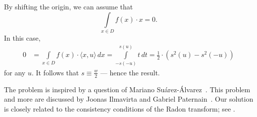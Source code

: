 By shifting the origin, we can assume that
\[\int\limits_{x \in D} f(x) \cdot x = 0.\]
In this case,
\begin{align*}
0
&= \int\limits_{x \in D} f(x) \cdot \langle x, u \rangle \, dx = \int\limits_{-s(-u)}^{s(u)} t \, dt = \tfrac{1}{2} \cdot (s^2(u) - s^2(-u))
\end{align*}
for any $u$.
It follows that $s \equiv \tfrac{w}{2}$ — hence the result.
\qeds

The problem is inspired by a question of Mariano Suárez-Álvarez~\cite{suarez-alvarez}.
This problem and more are discussed by Joonas Ilmavirta and Gabriel Paternain~\cite{ilmavirta-paternain}.
Our solution is closely related to the consistency conditions of the Radon transform;
see \cite[Lemma 2.3, Chapter I]{helgason}.



